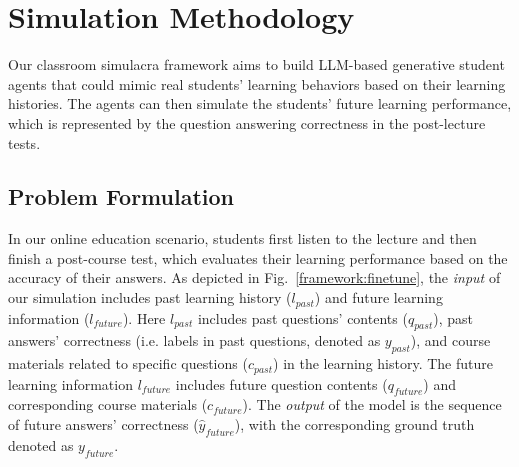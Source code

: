 \section{Simulation Methodology}
\label{sec:model}
Our classroom simulacra framework aims to build LLM-based generative student agents that could mimic real students' learning behaviors based on their learning histories. The agents can then simulate the students' future learning performance, which is represented by the question answering correctness in the post-lecture tests. 

\subsection{Problem Formulation}
\label{subsec: problem formulate}
In our online education scenario, students first listen to the lecture and then finish a post-course test, which evaluates their learning performance based on the accuracy of their answers. As depicted in Fig.~\ref{framework:finetune}, the \textit{input} of our simulation includes past learning history ($l_{past}$) and future learning information ($l_{future}$). Here $l_{past}$ includes past questions' contents ($q_{past}$), past answers' correctness (i.e. labels in past questions, denoted as $y_{past}$), and course materials related to specific questions ($c_{past}$) in the learning history. The future learning information $l_{future}$ includes future question contents ($q_{future}$) and corresponding course materials ($c_{future}$). The \textit{output} of the model is the sequence of future answers' correctness ($\hat{y}_{future}$), with the corresponding ground truth denoted as $y_{future}$.


